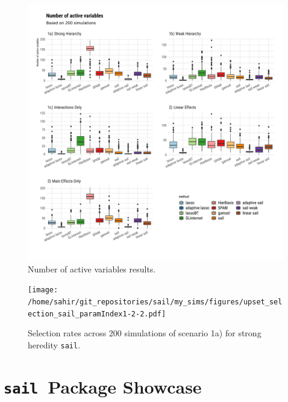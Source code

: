 \documentclass[12pt,letter]{article}\usepackage[]{graphicx}\usepackage[]{color}
\newenvironment{knitrout}{}{} %
\newcommand{\sail}{\texttt{sail}}
\begin{document}
\begin{knitrout}\scriptsize
{}\color{fgcolor}\begin{figure}[H]

{\centering \includegraphics[width=1\linewidth]{figure/plot-nactive-sim-1} 

}

\caption[Number of active variables results]{Number of active variables results.}\label{fig:plot-nactive-sim}
\end{figure}


\end{knitrout}


\begin{figure}[H]
	\centering
	\texttt{[image: /home/sahir/git\_repositories/sail/my\_sims/figures/upset\_selection\_sail\_paramIndex1-2-2.pdf]}
	\caption{Selection rates across 200 simulations of scenario 1a) for strong heredity \sail.}\label{fig:upset}
\end{figure}

\FloatBarrier

\section{\sail ~Package Showcase} \label{ap:showcase}
\end{document}
